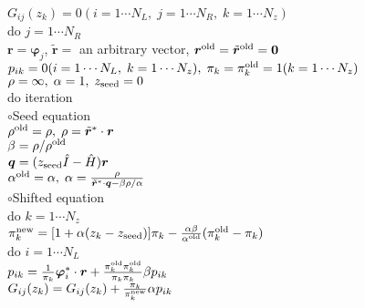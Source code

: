 \documentclass[12pt,titlepage]{article}
\begin{document}
\noindent
$G_{i j}(z_k) = 0 (i=1 \cdots N_L,\; j = 1 \cdots N_R,\; k=1 \cdots N_z)$
\\
do $j = 1 \cdots N_R$
\\\hspace{0.5cm}
${\boldsymbol r} = {\boldsymbol \varphi_j}$, ${\tilde {\boldsymbol r}} = $ an arbitrary vector,
${\boldsymbol r}^{\rm old} = {\tilde {\boldsymbol r}}^{\rm old} = {\bf 0}$
\\\hspace{0.5cm}
$p_{i k} = 0(i=1 \cdots N_L,\; k=1 \cdots N_z),\; \pi_k=\pi_k^{\rm old} = 1(k=1 \cdots N_z)$ 
\\\hspace{0.5cm}
$\rho = \infty,\; \alpha = 1,\; z_{\rm seed}=0$ 
\\\hspace{0.5cm}
do iteration
\\\hspace{1.0cm}
$\circ$Seed equation
\\\hspace{1.0cm}
$\rho^{\rm old} = \rho,\; \rho = {\tilde {\boldsymbol r}}^* \cdot {\boldsymbol r}$
\\\hspace{1.0cm}
$\beta = \rho / \rho^{\rm old}$
\\\hspace{1.0cm}
${\boldsymbol q} = (z_{\rm seed} {\hat I} - {\hat H}){\boldsymbol r}$
\\\hspace{1.0cm}
$\alpha^{\rm old} = \alpha,\; 
\alpha = \frac{\rho}{{\tilde {\boldsymbol r}}^*\cdot{\boldsymbol q} - \beta \rho / \alpha }$
\\\hspace{1.0cm}
$\circ$Shifted equation
\\\hspace{1.0cm}
do $k = 1 \cdots N_z$
\\\hspace{1.5cm}
$\pi_k^{\rm new} = [1+\alpha(z_k-z_{\rm seed})]\pi_k - \frac{\alpha \beta}{\alpha^{\rm old}}(\pi_k^{\rm old} - \pi_k)$
\\\hspace{1.5cm}
do $i = 1 \cdots N_L$
\\\hspace{2.0cm}
$p_{i k} = \frac{1}{\pi_k} {\boldsymbol \varphi}_i^* \cdot {\boldsymbol r} + 
\frac{\pi^{\rm old}_k \pi^{\rm old}_k}{\pi_k \pi_k} \beta p_{i k}$
\\\hspace{2.0cm}
$G_{i j}(z_k) = G_{i j}(z_k) + \frac{\pi_k}{\pi_k^{\rm new}} \alpha p_{i k}$
\end{document}
